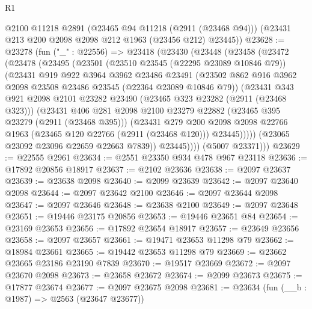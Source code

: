 \begin{lexlean}{R1}
\begin{coremodule}
      @2100
      @11218
      @2891
      (@23465 @94 @11218 (@2911 (@23468 @94)))
      (@23431 @213 @200 @2098 @2098 @212 @1963 (@23456 @212) @23445))
@23628 := @23278
    (fun ("_" : @22556) =>
    @23418
      (@23430
        (@23448
          (@23458
            (@23472
              (@23478
                (@23495
                  (@23501
                    (@23510 @23545 (@22295 @23089 @10846 @79))
                    (@23431
                      @919
                      @922
                      @3964
                      @3962
                      @23486
                      @23491
                      (@23502 @862 @916 @3962 @2098 @23508 @23486 @23545 (@22364 @23089 @10846 @79))
                      (@23431
                        @343
                        @921
                        @2098
                        @2101
                        @23282
                        @23490
                        (@23465 @323 @23282 (@2911 (@23468 @323)))
                        (@23431
                          @406
                          @281
                          @2098
                          @2100
                          @23279
                          @22882
                          (@23465 @395 @23279 (@2911 (@23468 @395)))
                          (@23431
                            @279
                            @200
                            @2098
                            @2098
                            @22766
                            @1963
                            (@23465 @120 @22766 (@2911 (@23468 @120)))
                            @23445)))))
                  (@23065 @23092 @23096 @22659 @22663 @7839))
                @23445))))
        (@5007 @23371)))
@23629 := @22555 @2961
@23634 := @2551 @23350 @934 @478 @967 @23118
@23636 := @17892 @20856 @18917
@23637 := @2102 @23636
@23638 := @2097 @23637
@23639 := @23638 @2098
@23640 := @2099 @23639
@23642 := @2097 @23640 @2098
@23644 := @2097 @23642 @2100
@23646 := @2097 @23644 @2098
@23647 := @2097 @23646
@23648 := @23638 @2100
@23649 := @2097 @23648
@23651 := @19446 @23175 @20856
@23653 := @19446 @23651 @84
@23654 := @23169 @23653
@23656 := @17892 @23654 @18917
@23657 := @23649 @23656
@23658 := @2097 @23657
@23661 := @19471 @23653 @11298 @79
@23662 := @18984 @23661
@23665 := @19442 @23653 @11298 @79
@23669 := @23662 @23665 @23186 @23190 @7839
@23670 := @19517 @23669
@23672 := @2097 @23670 @2098
@23673 := @23658 @23672
@23674 := @2099 @23673
@23675 := @17877 @23674
@23677 := @2097 @23675 @2098
@23681 := @23634 (fun (__b : @1987) => @2563 (@23647 @23677))

\end{coremodule}
\end{lexlean}

